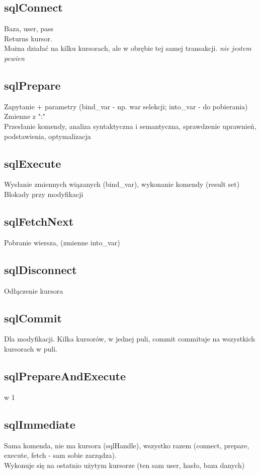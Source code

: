 \documentclass[a4paper,twoside]{article}
\begin{document}
  	\subsection*{sqlConnect} \noindent 
  	Baza, user, pass\\
  	Returns kursor.\\
  	Można działać na kilku kursorach, ale w obrębie tej samej transakcji. \emph{nie jestem pewien}
  	\subsection*{sqlPrepare} \noindent 
  	Zapytanie + parametry (bind\_var - np. war selekcji; into\_var - do pobierania)\\
  	Zmienne z ":"\\
  	Przesłanie komendy, analiza syntaktyczna i semantyczna, sprawdzenie uprawnień, podstawienia, optymalizacja
  	\subsection*{sqlExecute} \noindent 
  	Wysłanie zmiennych wiązanych (bind\_var), wykonanie komendy (result set)\\
  	Blokady przy modyfikacji
  	\subsection*{sqlFetchNext} \noindent 
  	Pobranie wiersza, (zmienne into\_var)
  	\subsection*{sqlDisconnect} \noindent 
  	Odłączenie kursora
  	\subsection*{sqlCommit} \noindent 
  	Dla modyfikacji. Kilka kursorów, w jednej puli, commit commituje na wszystkich kursorach w puli.
  	\subsection*{sqlPrepareAndExecute}  w 1
  	\subsection*{sqlImmediate} \noindent 
  	Sama komenda, nie ma kursora (sqlHandle), wszystko razem (connect, prepare, execute, fetch - sam sobie zarządza).\\ Wykonuje się na ostatnio użytym kursorze (ten sam user, hasło, baza danych)
  	
\end{document}
